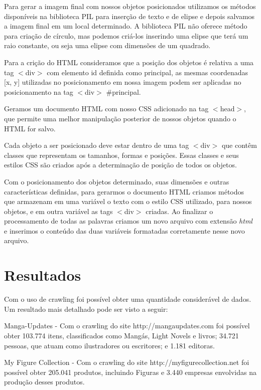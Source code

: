 \documentclass[12pt]{article}
\begin{document}
Para gerar a imagem final com nossos objetos posicionados utilizamos os métodos disponíveis na biblioteca PIL para inserção de texto e de elipse e depois salvamos a imagem final em um local determinado. A biblioteca PIL não oferece método para criação de círculo, mas podemos criá-los inserindo uma elipse que terá um raio constante, ou seja uma elipse com dimensões de um quadrado.

Para a crição do HTML consideramos que a posição dos objetos é relativa a uma tag $<$div$>$ com elemento id definida como principal, as mesmas coordenadas [x, y] utilizadas no posicionamento em nossa imagem podem ser aplicadas no posicionamento na tag $<$div$>$ \#principal.

Geramos um documento HTML com nosso CSS adicionado na tag $<$head$>$, que permite uma melhor manipulação posterior de nossos objetos quando o HTML for salvo.

Cada objeto a ser posicionado deve estar dentro de uma tag $<$div$>$ que contêm classes que representam os tamanhos, formas e posições. Essas classes e seus estilos CSS são criados após a determinação de posição de todos os objetos.

Com o posicionamento dos objetos determinado, suas dimensões e outras características definidas, para gerarmos o documento HTML criamos métodos que armazenam em uma variável o texto com o estilo CSS utilizado, para nossos objetos, e em outra variável as tags $<$div$>$ criadas. Ao finalizar o processamento de todas as palavras criamos um novo arquivo com extensão \textit{html} e inserimos o conteúdo das duas variáveis formatadas corretamente nesse novo arquivo. 


\section{Resultados}

Com o uso de crawling foi possível obter uma quantidade considerável de dados. Um resultado mais detalhado pode ser visto a seguir: 

Manga-Updates - Com o crawling do site http://mangaupdates.com foi possível obter 103.774 itens, classificados como Mangás, Light Novels e livros; 34.721 pessoas, que atuam como ilustradores ou escritores; e 1.181 editoras.

My Figure Collection - Com o crawling do site http://myfigurecollection.net foi possível obter 205.041 produtos, incluindo Figuras e 3.440 empresas envolvidas na produção desses produtos.
\end{document}
